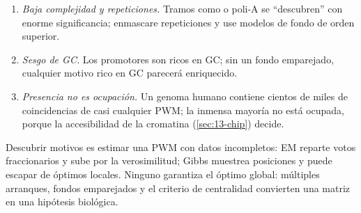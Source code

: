 
\begin{cuidado}
\begin{enumerate}
  \item \emph{Baja complejidad y repeticiones.} Tramos como  o poli-A se ``descubren'' con enorme significancia; enmascare repeticiones y use modelos de fondo de orden superior.
  \item \emph{Sesgo de GC.} Los promotores son ricos en GC; sin un fondo emparejado, cualquier motivo rico en GC parecerá enriquecido.
  \item \emph{Presencia no es ocupación.} Un genoma humano contiene cientos de miles de coincidencias de casi cualquier PWM; la inmensa mayoría no está ocupada, porque la accesibilidad de la cromatina (\cref{sec:13-chip}) decide.
\end{enumerate}
\end{cuidado}

\begin{ideaclave}
Descubrir motivos es estimar una PWM con datos incompletos: EM reparte votos fraccionarios y sube por la verosimilitud; Gibbs muestrea posiciones y puede escapar de óptimos locales. Ninguno garantiza el óptimo global: múltiples arranques, fondos emparejados y el criterio de centralidad convierten una matriz en una hipótesis biológica.
\end{ideaclave}

